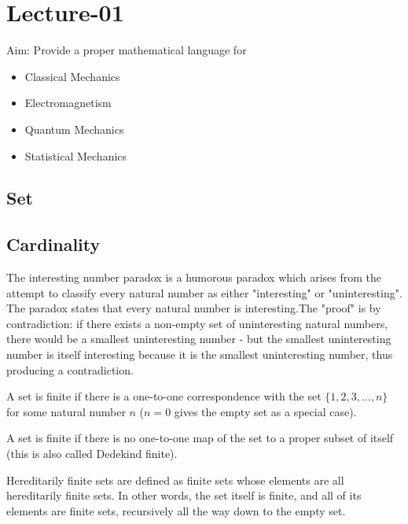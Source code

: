 \section{Lecture-01}

Aim: Provide a proper mathematical language for 
\begin{itemize}
    \item Classical Mechanics
    \item Electromagnetism
    \item Quantum Mechanics
    \item Statistical Mechanics
\end{itemize}


\subsection{Set}

\subsection{Cardinality}


The interesting number paradox is a humorous paradox which arises from the attempt to classify 
every natural number as either "interesting" or "uninteresting". The paradox states that every 
natural number is interesting.The "proof" is by contradiction: if there exists a non-empty set 
of uninteresting natural numbers, there would be a smallest uninteresting number - 
but the smallest uninteresting number is itself interesting because it is the smallest 
uninteresting number, thus producing a contradiction.

\begin{definition}
\label{D1}
A set is finite if there is a one-to-one correspondence with the set $\{1,2,3,…,n\}$ 
for some natural number $n$ ($n=0$ gives the empty set as a special case).
\end{definition}

\begin{definition}
\label{D2}
A set is finite if there is no one-to-one map of the set to a proper subset of itself 
(this is also called Dedekind finite).
\end{definition}

\begin{definition}
Hereditarily finite sets are defined as finite sets whose elements are all hereditarily finite sets. 
In other words, the set itself is finite, and all of its elements are finite sets, 
recursively all the way down to the empty set.
\end{definition}


